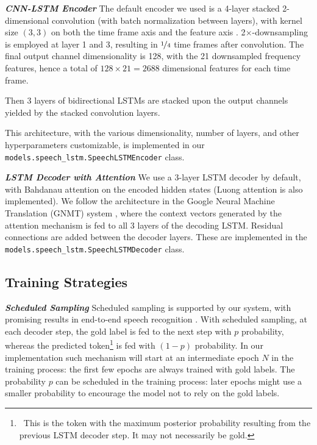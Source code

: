\documentclass{article}
\begin{document}
\vspace{0.2cm}
\noindent \textbf{\textit{CNN-LSTM Encoder}}\quad
\label{sec:lstm_encoder}
The default encoder we used is a 4-layer stacked 2-dimensional convolution (with batch normalization between layers), with kernel size $(3, 3)$ on both the time frame axis and the feature axis \cite{zhang2017very,watanabe2018espnet}. 2$\times$-downsampling is employed at layer 1 and 3, resulting in $\nicefrac{1}{4}$ time frames after convolution. The final output channel dimensionality is 128, with the 21 downsampled frequency features, hence a total of $128 \times 21 = 2688$ dimensional features for each time frame.

Then 3 layers of bidirectional LSTMs \cite{graves2005bidirectional} are stacked  upon the output channels yielded by the stacked convolution layers.

This architecture, with the various dimensionality, number of layers, and other hyperparameters customizable, is implemented in our \texttt{models.speech\_lstm.SpeechLSTMEncoder} class.

\vspace{0.2cm}
\noindent \textbf{\textit{LSTM Decoder with Attention}}\quad
\label{sec:lstm_decoder}
We use a 3-layer LSTM decoder by default, with Bahdanau attention \cite{bahdanau2015neural} on the encoded hidden states (Luong attention \cite{luong2015effective} is also implemented). We follow the architecture in the Google Neural Machine Translation (GNMT) system \cite{gnmt}, where the context vectors generated by the attention mechanism is fed to all 3 layers of the decoding LSTM. Residual connections \cite{he2016deep} are added between the decoder layers. These are implemented in the \texttt{models.speech\_lstm.SpeechLSTMDecoder} class.

\subsection{Training Strategies}




\vspace{0.2cm}
\noindent \textbf{\textit{Scheduled Sampling}}\quad
Scheduled sampling \cite{bengio2015scheduled} is supported by our system, with promising results in end-to-end speech recognition \cite{baskar2019promising}. With scheduled sampling, at each decoder step, the gold label is fed to the next step with $p$ probability, whereas the predicted token\footnote{~This is the token with the maximum posterior probability resulting from the previous LSTM decoder step. It may not necessarily be gold.} is fed with $(1-p)$ probability. In our implementation such mechanism will start at an intermediate epoch $N$ in the training process: the first few epochs are always trained with gold labels. The probability $p$ can be scheduled in the training process: later epochs might use a smaller probability to encourage the model not to rely on the gold labels.
\end{document}
